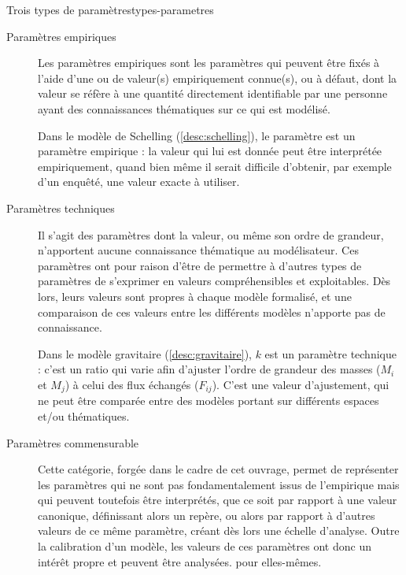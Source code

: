\begin{encadre}{Trois types de paramètres}{types-parametres}
	
	
	\begin{description}
		\item[Paramètres empiriques] Les paramètres empiriques sont les paramètres qui peuvent être fixés à l'aide d'une ou de valeur(s) empiriquement connue(s), ou à défaut, dont la valeur se réfère à une quantité directement identifiable par une personne ayant des connaissances thématiques sur ce qui est modélisé.
		\begin{mdframed}[backgroundcolor=gray!10,footnoteinside=false]
			Dans le modèle de Schelling (\ref{desc:schelling}), le paramètre  est un paramètre empirique : la valeur qui lui est donnée peut être interprétée empiriquement, quand bien même il serait difficile d'obtenir, par exemple d'un enquêté, une valeur exacte à utiliser.
		\end{mdframed}
		\item[Paramètres techniques] Il s'agit des paramètres dont la valeur, ou même son ordre de grandeur, n'apportent aucune connaissance thématique au modélisateur. Ces paramètres ont pour raison d'être de permettre à d'autres types de paramètres de s'exprimer en valeurs compréhensibles et exploitables. Dès lors, leurs valeurs sont propres à chaque modèle formalisé, et une comparaison de ces valeurs entre les différents modèles n'apporte pas de connaissance.
		
		\begin{mdframed}[backgroundcolor=gray!10,footnoteinside=false]
			Dans le modèle gravitaire (\cref{desc:gravitaire}), $k$ est un paramètre technique : c'est un ratio qui varie afin d'ajuster l'ordre de grandeur des masses ($M_i$ et $M_j$) à celui des flux  échangés ($F_{ij}$). C'est une valeur d'ajustement, qui ne peut être comparée entre des modèles portant sur différents espaces et/ou thématiques\footnotemark.
		\end{mdframed}
		
		\item[Paramètres \og commensurable \fg{}]
		
		Cette catégorie, forgée dans le cadre de cet ouvrage, permet de représenter les paramètres qui ne sont pas fondamentalement issus de l'empirique mais qui peuvent toutefois être interprétés, que ce soit par rapport à une valeur canonique, définissant alors un repère, ou alors par rapport à d'autres valeurs de ce même paramètre, créant dès lors une échelle d'analyse. Outre la calibration d'un modèle, les valeurs de ces paramètres ont donc un intérêt propre et peuvent être analysées. pour elles-mêmes.
		

\end{description}
\end{encadre}
